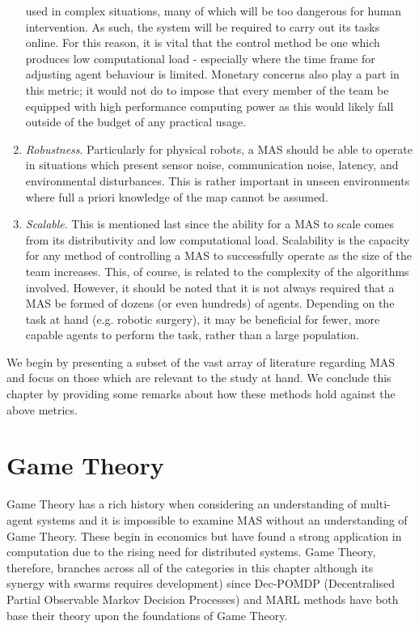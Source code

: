 \documentclass[.../main.tex]{subfiles}
\begin{document}
\begin{enumerate}
used in complex situations, many of which will be too dangerous for human intervention. As such, the
system will be required to carry out its tasks online. For this reason, it is vital that the control
method be one which produces low computational load - especially where the time frame for adjusting
agent behaviour is limited. Monetary concerns also play a part in this metric; it would not do to
impose that every member of the team be equipped with high performance computing power as this would
likely fall outside of the budget of any practical usage.
    \item {\em Robustness}. Particularly for physical robots, a MAS should be able to operate in
situations which present sensor noise, communication noise, latency, and environmental disturbances.
This is rather important in unseen environments where full a priori knowledge of the map cannot be
assumed.
    \item {\em Scalable}. This is mentioned last since the ability for a MAS to scale comes from
its distributivity  and low computational load. Scalability is the capacity for any method of
controlling a MAS to successfully operate as the size of the team increases. This, of course, is
related to the complexity of the algorithms involved. However, it should be noted that it is not
always required that a MAS be formed of dozens (or even hundreds) of agents. Depending on the task
at hand (e.g. robotic surgery), it may be beneficial for fewer, more capable agents to perform the
task, rather than a large population. 
\end{enumerate}

We begin by presenting a subset of the vast array of literature regarding MAS and focus on those
which are relevant to the study at hand. We conclude this chapter by providing some remarks about
how these methods hold against the above metrics.

\section{Game Theory} \label{sec::Game_Theory}

Game Theory has a rich history when considering an understanding of multi-agent systems and it is
impossible to examine MAS without an understanding of Game Theory. These begin in economics but have
found a strong application in computation due to the rising need for distributed systems. Game
Theory, therefore, branches across all of the categories in this chapter although its synergy with
swarms requires development) since Dec-POMDP (Decentralised Partial Observable Markov Decision
Processes) and MARL methods have both base their theory upon the foundations of Game Theory.
\end{document}
